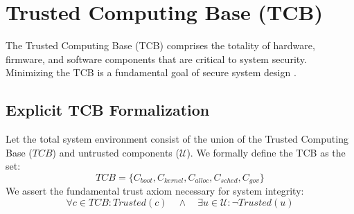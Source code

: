\documentclass[conference]{IEEEtran}
\begin{document}
\section{Trusted Computing Base (TCB)}
The Trusted Computing Base (TCB) comprises the totality of hardware, firmware, and software components that are critical to system security. Minimizing the TCB is a fundamental goal of secure system design \cite{b3}. 

\subsection{Explicit TCB Formalization}
Let the total system environment consist of the union of the Trusted Computing Base ($TCB$) and untrusted components ($\mathcal{U}$). We formally define the TCB as the set:
\begin{equation}
TCB = \{ C_{boot}, C_{kernel}, C_{alloc}, C_{sched}, C_{gov} \}
\end{equation}
We assert the fundamental trust axiom necessary for system integrity:
\begin{equation}
\forall c \in TCB : Trusted(c) \quad \land \quad \exists u \in \mathcal{U} : \neg Trusted(u)
\end{equation}
\end{document}
